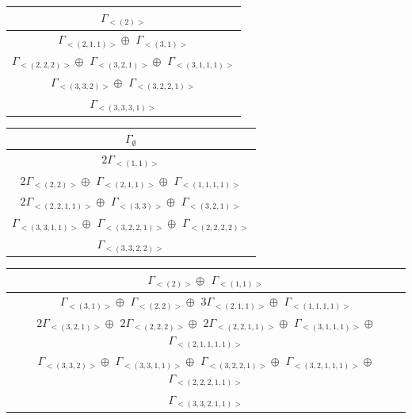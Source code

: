 \begin{minipage}{.45\textwidth}
\centering
\begin{tabular}{|c|}\hline
$\Gamma_{<(
2
)>}$
\\ \hline
$\Gamma_{<(
2 , 
1 , 
1
)>} \oplus$
$\Gamma_{<(
3 , 
1
)>}$
\\ \hline
$\Gamma_{<(
2 , 
2 , 
2
)>} \oplus$
$\Gamma_{<(
3 , 
2 , 
1
)>} \oplus$
$\Gamma_{<(
3 , 
1 , 
1 , 
1
)>}$
\\ \hline
$\Gamma_{<(
3 , 
3 , 
2
)>} \oplus$
$\Gamma_{<(
3 , 
2 , 
2 , 
1
)>}$
\\ \hline
$\Gamma_{<(
3 , 
3 , 
3 , 
1
)>}$
\\
\hline\end{tabular}\end{minipage}
\begin{minipage}{.4\textwidth}
\centering
\begin{tabular}{|c|}\hline
$\Gamma_\emptyset$
\\ \hline
$ 2 \Gamma_{<(
1 , 
1
)>}$
\\ \hline
$ 2 \Gamma_{<(
2 , 
2
)>} \oplus$
$\Gamma_{<(
2 , 
1 , 
1
)>} \oplus$
$\Gamma_{<(
1 , 
1 , 
1 , 
1
)>}$
\\ \hline
$ 2 \Gamma_{<(
2 , 
2 , 
1 , 
1
)>} \oplus$
$\Gamma_{<(
3 , 
3
)>} \oplus$
$\Gamma_{<(
3 , 
2 , 
1
)>}$
\\ \hline
$\Gamma_{<(
3 , 
3 , 
1 , 
1
)>} \oplus$
$\Gamma_{<(
3 , 
2 , 
2 , 
1
)>} \oplus$
$\Gamma_{<(
2 , 
2 , 
2 , 
2
)>}$
\\ \hline
$\Gamma_{<(
3 , 
3 , 
2 , 
2
)>}$
\\
\hline\end{tabular}\end{minipage}
\bigskip
\begin{minipage}{1\textwidth}
\centering
\begin{tabular}{|c|}\hline
$\Gamma_{<(
2
)>} \oplus$
$\Gamma_{<(
1 , 
1
)>}$
\\ \hline
$\Gamma_{<(
3 , 
1
)>} \oplus$
$\Gamma_{<(
2 , 
2
)>} \oplus$
$ 3 \Gamma_{<(
2 , 
1 , 
1
)>} \oplus$
$\Gamma_{<(
1 , 
1 , 
1 , 
1
)>}$
\\ \hline
$ 2 \Gamma_{<(
3 , 
2 , 
1
)>} \oplus$
$ 2 \Gamma_{<(
2 , 
2 , 
2
)>} \oplus$
$ 2 \Gamma_{<(
2 , 
2 , 
1 , 
1
)>} \oplus$
$\Gamma_{<(
3 , 
1 , 
1 , 
1
)>} \oplus$
$\Gamma_{<(
2 , 
1 , 
1 , 
1 , 
1
)>}$
\\ \hline
$\Gamma_{<(
3 , 
3 , 
2
)>} \oplus$
$\Gamma_{<(
3 , 
3 , 
1 , 
1
)>} \oplus$
$\Gamma_{<(
3 , 
2 , 
2 , 
1
)>} \oplus$
$\Gamma_{<(
3 , 
2 , 
1 , 
1 , 
1
)>} \oplus$
$\Gamma_{<(
2 , 
2 , 
2 , 
1 , 
1
)>}$
\\ \hline
$\Gamma_{<(
3 , 
3 , 
2 , 
1 , 
1
)>}$
\\
\hline\end{tabular}\end{minipage}
